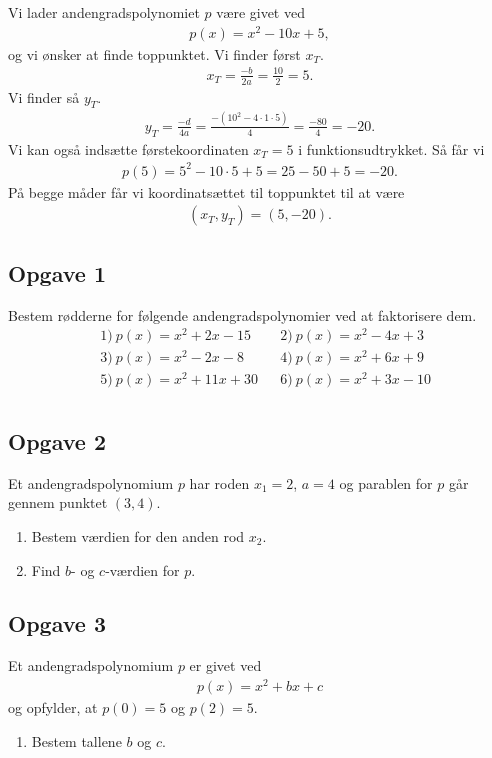 \begin{exa}
	Vi lader andengradspolynomiet $p$ være givet ved
	\begin{align*}
		p(x) = x^2 - 10x + 5,
	\end{align*}
	og vi ønsker at finde toppunktet. Vi finder først $x_T$.
	\begin{align*}
		x_T = \frac{-b}{2a} = \frac{10}{2} = 5.
	\end{align*}
	Vi finder så $y_T$.
	\begin{align*}
		y_T = \frac{-d}{4a} = \frac{-(10^2 - 4\cdot 1 \cdot 5)}{4} = \frac{-80}{4} = -20.
	\end{align*}
	Vi kan også indsætte førstekoordinaten $x_T = 5$ i funktionsudtrykket. Så får vi
	\begin{align*}
		p(5) = 5^2 - 10\cdot 5 + 5 = 25-50+5 = -20.
	\end{align*}
	På begge måder får vi koordinatsættet til toppunktet til at være 
	\begin{align*}
		\left(x_T,y_T\right) = \left(5,-20\right).
	\end{align*}
\end{exa}
\subsection*{Opgave 1}

Bestem rødderne for følgende andengradspolynomier ved at faktorisere dem. 
\begin{align*}
	&1) \ p(x) = x^2 + 2x - 15 &  &2) \ p(x) = x^2-4x + 3 \\
	&3) \ p(x) = x^2 - 2x - 8 &  &4) \ p(x) = x^2 + 6x + 9 \\
	&5) \ p(x) = x^2 + 11x + 30 &  &6) \ p(x) = x^2 + 3x - 10 \\
\end{align*}

\subsection*{Opgave 2}
Et andengradspolynomium $p$ har roden $x_1 = 2$, $a= 4$ og parablen for $p$ går gennem punktet $(3,4)$. 
\begin{enumerate}[label=\roman*)]
	\item Bestem værdien for den anden rod $x_2$. 
	\item Find $b$- og $c$-værdien for $p$. 
\end{enumerate}

\subsection*{Opgave 3}
Et andengradspolynomium $p$ er givet ved
\begin{align*}
	p(x) = x^2 + bx +c 
\end{align*}
og opfylder, at $p(0) = 5$ og $p(2) = 5$.
\begin{enumerate}[label=\roman*)]
	\item Bestem tallene $b$ og $c$. 
\end{enumerate}

